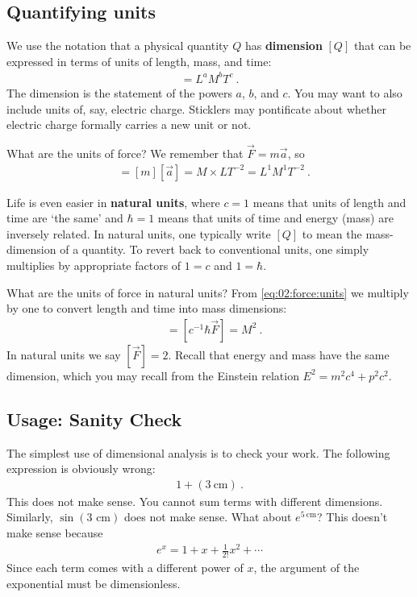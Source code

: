 \subsection{Quantifying units}

We use the notation that a physical quantity $Q$ has \textbf{dimension} $[Q]$ that can be expressed in terms of units of length, mass, and time:
\begin{align}
  [Q] = L^a M^b T^c \ .
\end{align}
The {dimension} is the statement of the powers $a$, $b$, and $c$. You may want to also include units of, say, electric charge. Sticklers may pontificate about whether electric charge formally carries a new unit or not. 

\begin{example}
What are the units of force? We remember that $\vec{F} = m\vec{a}$, so 
\begin{align}
  [\vec F] &= [m][\vec{a}] = M\times L T^{-2} = L^1 M^1 T^{-2} \ .
  \label{eq:02:force:units}
\end{align}
\end{example}

Life is even easier in \textbf{natural units}, where $c=1$ means that units of length and time are `the same’ and $\hbar = 1$ means that units of time and energy (mass) are inversely related. In natural units, one typically write $[Q]$ to mean the mass-dimension of a quantity. To revert back to conventional units, one simply multiplies by appropriate factors of $1=c$ and $1=\hbar$. 

\begin{example}
What are the units of force in natural units? From \eqref{eq:02:force:units} we multiply by one to convert length and time into mass dimensions:
\begin{align}
  [\vec F] &= [c^{-1} \hbar \vec{F}] = M^2 \ .
\end{align}
In natural units we say $[\vec F] = 2$. Recall that energy and mass have the same dimension, which you may recall from the Einstein relation $E^2 = m^2c^4 + p^2c^2$.
\end{example}


\subsection{Usage: Sanity Check}

The simplest use of dimensional analysis is to check your work. The following expression is obviously wrong:
\begin{align}
  1 + (3~\text{cm}) \ .
\end{align}
This does not make sense. You cannot sum terms with different dimensions. Similarly, $\sin(3\text{ cm})$ does not make sense. What about $e^{5~\text{cm}}$? This doesn't make sense because
\begin{align}
  e^x = 1 + x + \frac{1}{2!} x^2 +  \cdots
\end{align}
Since each term comes with a different power of $x$, the argument of the exponential must be dimensionless. 

